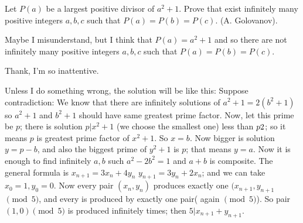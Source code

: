 \begin{solution}
	\begin{tcolorbox}Let $P(a)$ be a largest positive divisor of $a^2 + 1$. Prove that exist infinitely many positive integers $a, b, c$ such that $P(a)=P(b)=P(c)$.
(A. Golovanov).\end{tcolorbox}
Maybe I misunderstand, but I think that $P(a)=a^2+1$ and so there are not infinitely many positive integers $a, b, c$ such that $P(a)=P(b)=P(c)$.
\end{solution}



\begin{solution}
	Thank, I'm so inattentive.
\end{solution}



\begin{solution}
	Unless I do something wrong, the solution will be like this:
Suppose contradiction:
We know that there are infinitely solutions of $a^2+1=2(b^2+1)$ so $a^2+1$ and $b^2+1$ should have same greatest prime factor. Now, let this prime be $p$; there is solution $p|x^2+1$ (we choose the smallest one) less than $p\/2$; so it means $p$ is greatest prime factor of $x^2+1$. So $x=b$. Now bigger is solution $y=p-b$, and also the biggest prime of $y^2+1$ is $p$; that means $y=a$. Now it is enough to find infinitely $a, b$ such $a^2-2b^2=1$ and $a+b$ is composite. The general formula is
$x_{n+1}=3x_n+4y_n$
$y_{n+1}=3y_n+2x_n$; and we can take $x_0=1, y_0=0$.
Now every pair $(x_n,y_n)$ produces exactly one $(x_{n+1},y_{n+1}$ $\pmod 5$, and every is produced by exactly one pair( again $\pmod 5$). So pair $(1,0) \pmod 5$ is produced infinitely times; then $5|x_{n+1}+y_{n+1}$.
\end{solution}




